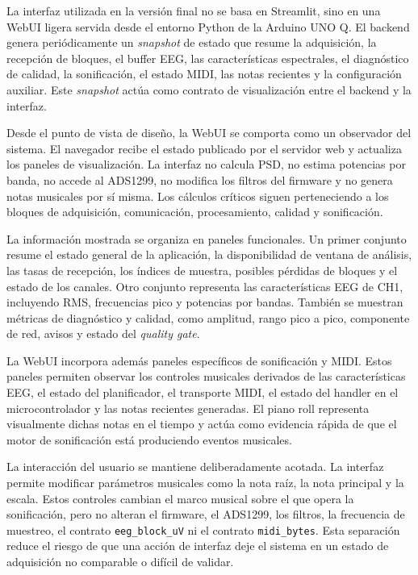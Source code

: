 \documentclass[../main.tex]{subfiles}
\begin{document}
La interfaz utilizada en la versión final no se basa en Streamlit, sino en una WebUI ligera servida desde el entorno Python de la Arduino UNO Q. El backend genera periódicamente un \textit{snapshot} de estado que resume la adquisición, la recepción de bloques, el buffer EEG, las características espectrales, el diagnóstico de calidad, la sonificación, el estado MIDI, las notas recientes y la configuración auxiliar. Este \textit{snapshot} actúa como contrato de visualización entre el backend y la interfaz.

Desde el punto de vista de diseño, la WebUI se comporta como un observador del sistema. El navegador recibe el estado publicado por el servidor web y actualiza los paneles de visualización. La interfaz no calcula PSD, no estima potencias por banda, no accede al ADS1299, no modifica los filtros del firmware y no genera notas musicales por sí misma. Los cálculos críticos siguen perteneciendo a los bloques de adquisición, comunicación, procesamiento, calidad y sonificación.

La información mostrada se organiza en paneles funcionales. Un primer conjunto resume el estado general de la aplicación, la disponibilidad de ventana de análisis, las tasas de recepción, los índices de muestra, posibles pérdidas de bloques y el estado de los canales. Otro conjunto representa las características EEG de CH1, incluyendo RMS, frecuencias pico y potencias por bandas. También se muestran métricas de diagnóstico y calidad, como amplitud, rango pico a pico, componente de red, avisos y estado del \textit{quality gate}.

La WebUI incorpora además paneles específicos de sonificación y MIDI. Estos paneles permiten observar los controles musicales derivados de las características EEG, el estado del planificador, el transporte MIDI, el estado del handler en el microcontrolador y las notas recientes generadas. El piano roll representa visualmente dichas notas en el tiempo y actúa como evidencia rápida de que el motor de sonificación está produciendo eventos musicales.

La interacción del usuario se mantiene deliberadamente acotada. La interfaz permite modificar parámetros musicales como la nota raíz, la nota principal y la escala. Estos controles cambian el marco musical sobre el que opera la sonificación, pero no alteran el firmware, el ADS1299, los filtros, la frecuencia de muestreo, el contrato \texttt{eeg\_block\_uV} ni el contrato \texttt{midi\_bytes}. Esta separación reduce el riesgo de que una acción de interfaz deje el sistema en un estado de adquisición no comparable o difícil de validar.
\end{document}

